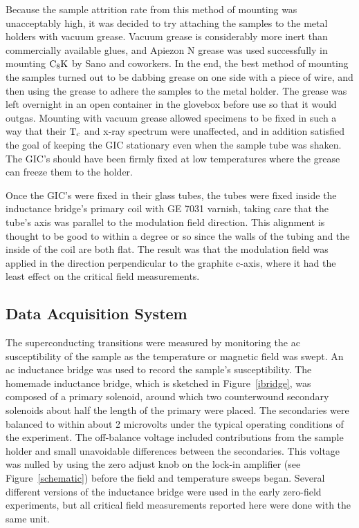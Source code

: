 	Because the sample attrition rate from this  method of mounting was
unacceptably high, it was decided to try attaching the samples to the metal
holders with vacuum grease.  Vacuum grease is considerably  more inert than
commercially available glues, and Apiezon N grease was used successfully in
mounting $\rm C_8K$ by   Sano and coworkers.\cite{sano80}  In the  end, the
best method of mounting the samples turned out to  be dabbing grease on one
side with a piece of wire, and then using the grease to  adhere the samples
to the metal holder.  The grease was left overnight in an open container in
the  glovebox before use so that  it  would outgas.    Mounting with vacuum
grease allowed specimens to be fixed in such a way that their $\rm T_c$ and
x-ray  spectrum  were unaffected,  and in addition   satisfied  the goal of
keeping the GIC stationary even when the sample tube was shaken.  The GIC's
should have been firmly   fixed at  low temperatures  where the  grease can
freeze them to the holder.

	Once the GIC's  were  fixed in their glass   tubes, the tubes  were
fixed inside the  inductance  bridge's primary coil  with GE  7031 varnish,
taking care  that the   tube's axis was parallel  to  the modulation  field
direction.  This alignment  is thought to be good  to within a degree or so
since the walls of the  tubing  and  the inside of the  coil are both flat.
The  result was  that the modulation  field was  applied in  the  direction
perpendicular to the graphite c-axis, where it had the  least effect on the
critical field measurements.

\subsection{Data Acquisition System}
\label{electronics}

	The  superconducting  transitions  were  measured by monitoring the
ac susceptibility  of the sample  as  the temperature or  magnetic
field was swept.  An ac inductance bridge  was used to record  the sample's
susceptibility.   The homemade inductance  bridge,   which is  sketched  in
Figure~\ref{ibridge}, was composed of a  primary  solenoid, around which
two counterwound secondary solenoids about  half the length  of the primary
were placed.  The  secondaries were balanced  to within about  2 microvolts
under the typical operating conditions of the experiment.   The off-balance
voltage included contributions from the sample holder and small unavoidable
differences between the secondaries.  This voltage was nulled  by using the
zero adjust knob on  the  lock-in amplifier (see   Figure~\ref{schematic})
before  the field  and  temperature  sweeps    began.   Several   different
versions of the  inductance bridge were  used in the early zero-field
experiments,  but  all critical  field measurements  reported here were done
with the same unit.

